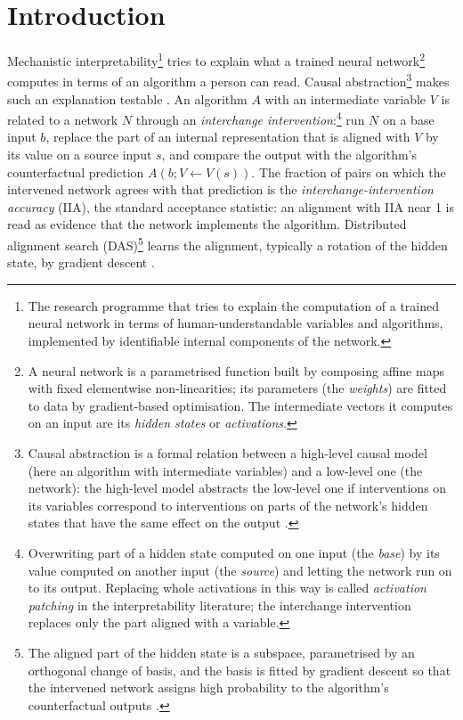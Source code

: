 \documentclass[11pt,a4paper]{article}
\begin{document}
\begin{abstract}
expressive map family that the plug-in accepts. This Fisher-weighted complexity separates valid from manufactured alignments twentyfold; its floor is the parameter-free Jacobian lens, which is faithful at the last layers of four language models and codes the indirect-object name shortest at learning coefficient 0.
\end{abstract}

\section{Introduction}
\label{sec:intro}

Mechanistic interpretability\footnote{The research programme that tries to explain the computation of a trained neural network in terms of human-understandable variables and algorithms, implemented by identifiable internal components of the network.} tries to explain what a trained neural network\footnote{A neural network is a parametrised function built by composing affine maps with fixed elementwise non-linearities; its parameters (the \emph{weights}) are fitted to data by gradient-based optimisation. The intermediate vectors it computes on an input are its \emph{hidden states} or \emph{activations}.} computes in terms of an algorithm a person can read. Causal abstraction\footnote{Causal abstraction is a formal relation between a high-level causal model (here an algorithm with intermediate variables) and a low-level one (the network): the high-level model abstracts the low-level one if interventions on its variables correspond to interventions on parts of the network's hidden states that have the same effect on the output \cite{geiger2025ca}.} makes such an explanation testable \cite{geiger2025ca}. An algorithm $A$ with an intermediate variable $V$ is related to a network $N$ through an \emph{interchange intervention}:\footnote{Overwriting part of a hidden state computed on one input (the \emph{base}) by its value computed on another input (the \emph{source}) and letting the network run on to its output. Replacing whole activations in this way is called \emph{activation patching} in the interpretability literature; the interchange intervention replaces only the part aligned with a variable.} run $N$ on a base input $b$, replace the part of an internal representation that is aligned with $V$ by its value on a source input $s$, and compare the output with the algorithm's counterfactual prediction $A(b;V\leftarrow V(s))$. The fraction of pairs on which the intervened network agrees with that prediction is the \emph{interchange-intervention accuracy} (IIA), the standard acceptance statistic: an alignment with IIA near 1 is read as evidence that the network implements the algorithm. Distributed alignment search (DAS)\footnote{The aligned part of the hidden state is a subspace, parametrised by an orthogonal change of basis, and the basis is fitted by gradient descent so that the intervened network assigns high probability to the algorithm's counterfactual outputs \cite{geiger2024das}.} learns the alignment, typically a rotation of the hidden state, by gradient descent \cite{geiger2024das}.
\end{document}
